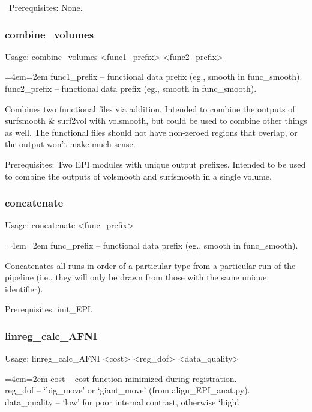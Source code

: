 \documentclass[final,titlepage,letterpaper,oneside,12pt]{article}
\renewcommand{\texttt}[2][BrickRed]{\textcolor{#1}{\ttfamily #2}}%
\newenvironment{blockquote}{%
  \par%
  \medskip
  \leftskip=4em\rightskip=2em%
  \noindent\ignorespaces}{%
  \par\medskip}
\begin{document}
\
Prerequisites: None.

\subsubsection{combine\_volumes}
Usage: \texttt{combine\_volumes <func1\_prefix> <func2\_prefix>}

\begin{blockquote}
func1\_prefix -- functional data prefix (eg., smooth in func\_smooth).
func2\_prefix -- functional data prefix (eg., smooth in func\_smooth).
\end{blockquote}

\noindent Combines two functional files via addition. Intended to combine the outputs of \texttt{surfsmooth} \& \texttt{surf2vol} with \texttt{volsmooth}, but could be used to combine other things as well. The functional files should not have non-zeroed regions that overlap, or the output won't make much sense.

Prerequisites: Two EPI modules with unique output prefixes. Intended to be used to combine the outputs of \texttt{volsmooth} and \texttt{surfsmooth} in a single volume. 

\subsubsection{concatenate}
Usage: \texttt{concatenate <func\_prefix>}

\begin{blockquote}
func\_prefix -- functional data prefix (eg., smooth in func\_smooth).
\end{blockquote}

\noindent Concatenates all runs in order of a particular type from a particular run of the pipeline (i.e., they will only be drawn from those with the same unique identifier).

Prerequisites: \texttt{init\_EPI}.

\subsubsection{linreg\_calc\_AFNI}
Usage: \texttt{linreg\_calc\_AFNI <cost> <reg\_dof> <data\_quality>}

\begin{blockquote}
cost -- cost function minimized during registration. \\
reg\_dof -- `big\_move' or `giant\_move' (from align\_EPI\_anat.py). \\
data\_quality -- `low' for poor internal contrast, otherwise `high'. \
\end{blockquote}
\end{document}
